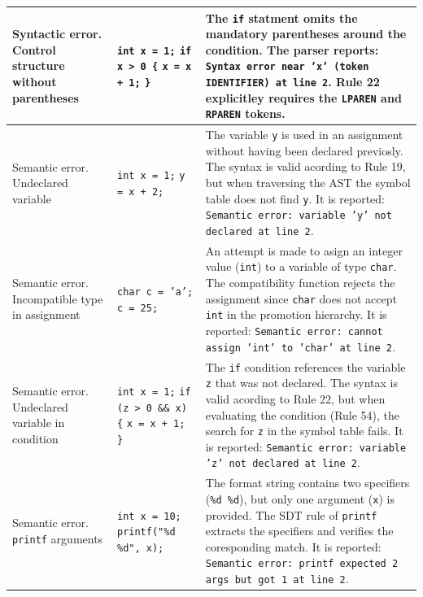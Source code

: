 \documentclass[letterpaper,12pt,oneside]{article}
\begin{document}
\begin{longtable}{|p{3.8cm}|p{3.5cm}|p{6.5cm}|}
\hline
Syntactic error. Control structure without parentheses &
\texttt{int x = 1;} \newline \texttt{if x > 0 \{} \newline \texttt{\quad x = x + 1;} \newline \texttt{\}} &
The \texttt{if} statment omits the mandatory parentheses around the condition. The parser reports: \texttt{Syntax error near 'x' (token IDENTIFIER) at line 2}. Rule 22 explicitley requires the \texttt{LPAREN} and \texttt{RPAREN} tokens. \\
\hline
Semantic error. Undeclared variable &
\texttt{int x = 1;} \newline \texttt{y = x + 2;} &
The variable \texttt{y} is used in an assignment without having been declared previosly. The syntax is valid acording to Rule 19, but when traversing the AST the symbol table does not find \texttt{y}. It is reported: \texttt{Semantic error: variable 'y' not declared at line 2}. \\
\hline
Semantic error. Incompatible type in assignment &
\texttt{char c = 'a';} \newline \texttt{c = 25;} &
An attempt is made to asign an integer value (\texttt{int}) to a variable of type \texttt{char}. The compatibility function rejects the assignment since \texttt{char} does not accept \texttt{int} in the promotion hierarchy. It is reported: \texttt{Semantic error: cannot assign 'int' to 'char' at line 2}. \\
\hline
Semantic error. Undeclared variable in condition &
\texttt{int x = 1;} \newline \texttt{if (z > 0 \&\& x) \{} \newline \texttt{\quad x = x + 1;} \newline \texttt{\}} &
The \texttt{if} condition references the variable \texttt{z} that was not declared. The syntax is valid acording to Rule 22, but when evaluating the condition (Rule 54), the search for \texttt{z} in the symbol table fails. It is reported: \texttt{Semantic error: variable 'z' not declared at line 2}. \\
\hline
Semantic error. \texttt{printf} arguments &
\texttt{int x = 10;} \newline \texttt{printf("\%d \%d", x);} &
The format string contains two specifiers (\texttt{\%d \%d}), but only one argument (\texttt{x}) is provided. The SDT rule of \texttt{printf} extracts the specifiers and verifies the coresponding match. It is reported: \texttt{Semantic error: printf expected 2 args but got 1 at line 2}. \\

\end{longtable}
\end{document}
